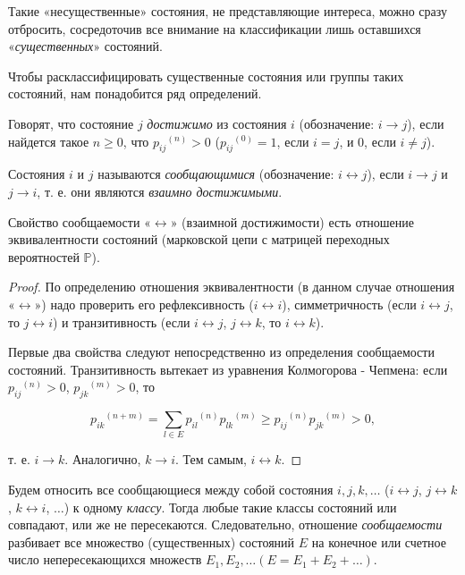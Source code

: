 Такие «несущественные» состояния, не представляющие интереса,
можно сразу отбросить, сосредоточив все внимание на классификации
лишь оставшихся «\emph{существенных}» состояний.

Чтобы расклассифицировать существенные состояния или группы
таких состояний, нам понадобится ряд определений.

\begin{definition} Говорят, что состояние $j$ \emph{достижимо} из состояния $i$ (обозначение: $i \rightarrow j$), если найдется такое $n \geq 0$, что ${p_{ij}}^{(n)} > 0$ (${p_{ij}}^{(0)} = 1$, если $i = j$, и 0, если $i \neq j$).

Состояния $i$ и $j$ называются \emph{сообщающимися} (обозначение: $i \leftrightarrow j$), если $i \rightarrow j$ и $j \rightarrow i$, т. е. они являются \emph{взаимно достижимыми}.
\end{definition}

\begin{lemma} Свойство сообщаемости «$\leftrightarrow$» (взаимной достижимости) есть отношение эквивалентности состояний (марковской цепи
с матрицей переходных вероятностей $\mathbb{P}$).
\end{lemma}

\begin{proof}По определению отношения эквивалентности (в данном случае отношения «$\leftrightarrow$») надо проверить его рефлексивность
($i\leftrightarrow i$), симметричность (если $i \leftrightarrow j$, то $j \leftrightarrow i$) и транзитивность (если
$i \leftrightarrow j$, $j \leftrightarrow k$, то $i \leftrightarrow k$).

Первые два свойства следуют непосредственно из определения сообщаемости состояний. Транзитивность вытекает из уравнения Колмогорова - Чепмена: если ${p_{ij}}^{(n)} > 0$, ${p_{jk}}^{(m)} > 0$, то

\[{p_{ik}}^{(n+m)} = \sum_{l \in E} {p_{il}}^{(n)} {p_{lk}}^{(m)} \geq {p_{ij}}^{(n)} {p_{jk}}^{(m)} > 0,\]

т. е. $i \rightarrow k$. Аналогично, $k \rightarrow i$. Тем самым, $i \leftrightarrow k$. \end{proof}

Будем относить все сообщающиеся между собой состояния $i, j, k, \ldots$
($i \leftrightarrow j$, $j \leftrightarrow k$, $k \leftrightarrow i$, $\ldots$) к одному \emph{классу}. Тогда любые такие классы состояний или совпадают, или же не пересекаются. Следовательно, отношение \emph{сообщаемости} разбивает все множество (существенных) состояний $E$ на конечное или счетное число непересекающихся множеств $E_1, E_2, \ldots (E = E_1 + E_2 + \ldots)$.

